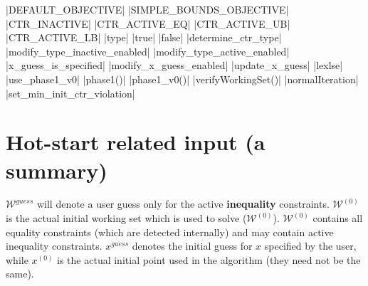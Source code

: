 \documentclass[12pt,a4paper]{article}
\begin{document}
|DEFAULT_OBJECTIVE|
|SIMPLE_BOUNDS_OBJECTIVE|
|CTR_INACTIVE|
|CTR_ACTIVE_EQ|
|CTR_ACTIVE_UB|
|CTR_ACTIVE_LB|
|type|
|true|
|false|
|determine_ctr_type|
|modify_type_inactive_enabled|
|modify_type_active_enabled|
|x_guess_is_specified|
|modify_x_guess_enabled|
|update_x_guess|
|lexlse|
|use_phase1_v0|
|phase1()|
|phase1_v0()|
|verifyWorkingSet()|
|normalIteration|
|set_min_init_ctr_violation|

\section{Hot-start related input (a summary)}

$\mathcal{W}^{\mathit{guess}}$ will denote a user guess only for the active {\bf inequality}
constraints. $\mathcal{W}^{(0)}$ is the actual initial working set which is used to solve
($\mathcal{W}^{(0)}$). $\mathcal{W}^{(0)}$ contains all equality constraints (which are
detected internally) and may contain active inequality constraints. $x^{\mathit{guess}}$ denotes the
initial guess for $x$ specified by the user, while $x^{(0)}$ is the actual initial point used in the
algorithm (they need not be the same).
\end{document}
